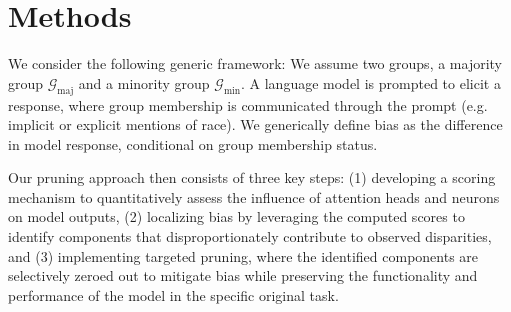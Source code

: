 \section{Methods}
We consider the following generic framework:
We assume two groups, a majority group $\mathcal{G}_{\mathrm{maj}}$ and a minority group $\mathcal{G}_{\mathrm{min}}$. A language model is prompted to elicit a response, where group membership is communicated through the prompt (e.g. implicit or explicit mentions of race). We generically define bias as the difference in model response, conditional on group membership status.

Our pruning approach then consists of three key steps: (1) developing a scoring mechanism to quantitatively assess the influence of attention heads and neurons on model outputs, (2) localizing bias by leveraging the computed scores to identify components that disproportionately contribute to observed disparities, and (3) implementing targeted pruning, where the identified components are selectively zeroed out to mitigate bias while preserving the functionality and performance of the model in the specific original task.




